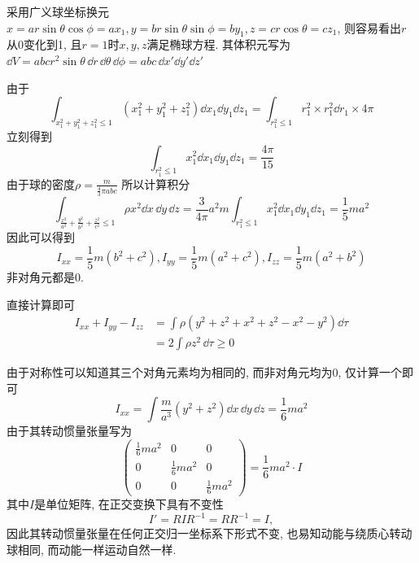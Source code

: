 \begin{solution}
    采用广义球坐标换元$x=ar\sin\theta\cos\phi=ax_1,y=br\sin\theta\sin\phi=by_1,z=cr\cos\theta=cz_1$, 则容易看出$r$从0变化到1, 且$r=1$时$x,y,z$满足椭球方程. 
    其体积元写为$\dd V=abcr^2\sin\theta\,\dd r\,\dd \theta\,\dd \phi=abc\,\dd x'\dd y'\dd z'$
    
    由于
    $$\int_{x_1^2+y_1^2+z_1^2\leq1}(x_1^2+y_1^2+z_1^2)\dd x_1\dd y_1\dd z_1=\int_{r_1^2\leq1}r_1^2\times r_1^2\dd r_1\times4\pi$$
    立刻得到
    $$\int_{r_1^2\leq1}x_1^2\dd x_1\dd y_1\dd z_1=\frac{4\pi}{15}$$
    由于球的密度$\rho=\frac{m}{\frac43\pi abc}$
    所以计算积分
    $$\int_{\frac{x^2}{a^2}+\frac{y^2}{b^2}+\frac{z^2}{c^2}\leq1}\rho x^2\dd x\,\dd y\,\dd z=\frac{3}{4\pi}a^2m\int_{r_1^2\leq1}x_1^2\dd x_1\dd y_1\dd z_1=\frac{1}{5}ma^2$$
    因此可以得到
    $$I_{xx}=\frac15m(b^2+c^2), I_{yy}=\frac15m(a^2+c^2), I_{zz}=\frac15m(a^2+b^2)$$
    非对角元都是0. 
\end{solution}
\begin{solution}
    直接计算即可
    \begin{align*}
        I_{xx}+I_{yy}-I_{zz}&=\int \rho(y^2+z^2+x^2+z^2-x^2-y^2)\dd \tau\\&=2\int\rho z^2 \,\dd \tau\geq0
    \end{align*}
\end{solution}
\begin{solution}
    由于对称性可以知道其三个对角元素均为相同的, 而非对角元均为0, 仅计算一个即可
    $$I_{xx}=\int\frac{m}{a^3}(y^2+z^2)\dd x\,\dd y\,\dd z=\frac16ma^2$$
    由于其转动惯量张量写为
    $$\begin{pmatrix}
        \frac16ma^2&0&0\\
        0&\frac16ma^2&0\\
        0&0&\frac16ma^2
    \end{pmatrix}=\frac16ma^2\cdot I$$
    其中$I$是单位矩阵, 在正交变换下具有不变性
    $$I'=RIR^{-1}=RR^{-1}=I,$$
    因此其转动惯量张量在任何正交归一坐标系下形式不变, 也易知动能与绕质心转动球相同, 而动能一样运动自然一样. 
\end{solution}

